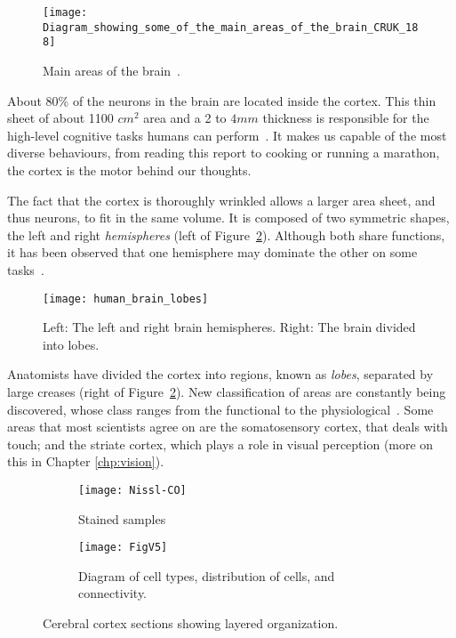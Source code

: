 \begin{figure}[hbt]
  \begin{center}
    \texttt{[image: Diagram\_showing\_some\_of\_the\_main\_areas\_of\_the\_brain\_CRUK\_188]}
    \caption{Main areas of the brain~\cite{wikipedia-images}.}
    \label{fig:brain:components}
  \end{center}
  
\end{figure}

About 80\% of the neurons in the brain are located inside the cortex. This thin sheet of about 1100 $cm^2$ area and a 2 to $4 mm$ thickness is responsible for the high-level cognitive tasks humans can perform~\cite{thompson2000brain}. It makes us capable of the most diverse behaviours, from reading this report to cooking or running a marathon, the cortex is the motor behind our thoughts. 

The fact that the cortex is thoroughly wrinkled allows a larger area sheet, and thus neurons, to fit in the same volume. It is composed of two symmetric shapes, the left and right \emph{hemispheres} (left of Figure~\ref{fig:brain:hemi-lobes}). Although both share functions, it has been observed that one hemisphere may dominate the other on some tasks~\cite{lateralization}. 

\begin{figure}[hbt]
  \begin{center}
    \texttt{[image: human\_brain\_lobes]}
    \caption{Left: The left and right brain hemispheres. Right: The brain divided into lobes.}
    \label{fig:brain:hemi-lobes}
  \end{center}
\end{figure}

Anatomists have divided the cortex into regions, known as \emph{lobes},  separated by large creases (right of Figure~\ref{fig:brain:hemi-lobes}). New classification of areas are constantly being discovered, whose class ranges from the functional to the physiological~\cite{eye-brain-vision-hubel1995}. Some areas that most scientists agree on are the somatosensory cortex, that deals with touch; and the striate cortex, which plays a role in visual perception (more on this in Chapter \ref{chp:vision}).

\begin{figure}[ht]
  \begin{center}
    \begin{subfigure}{0.4\textwidth}
      \texttt{[image: Nissl-CO]}
      \caption{Stained samples}
    \end{subfigure}
    \begin{subfigure}{0.4\textwidth}
      \texttt{[image: FigV5]}
      \caption{Diagram of cell types, distribution of cells, and connectivity.}
    \end{subfigure}
    \caption{Cerebral cortex sections showing layered organization.}
    \label{fig:neuro:cortex-layers}
  \end{center}
\end{figure}

